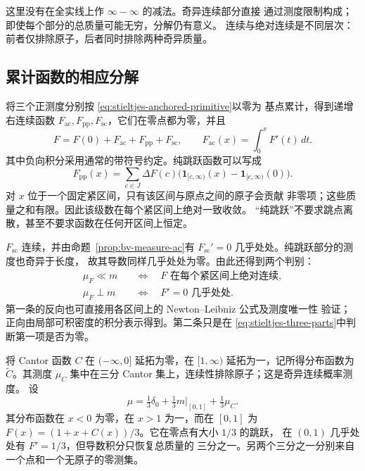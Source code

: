 这里没有在全实线上作 \(\infty-\infty\) 的减法。奇异连续部分直接
通过测度限制构成；即使每个部分的总质量可能无穷，分解仍有意义。
连续与绝对连续是不同层次：前者仅排除原子，后者同时排除两种奇异质量。

\subsection{累计函数的相应分解}

将三个正测度分别按 \eqref{eq:stieltjes-anchored-primitive}以零为
基点累计，得到递增右连续函数 \(F_{\mathrm{ac}},F_{\mathrm{pp}},
F_{\mathrm{sc}}\)，它们在零点都为零，并且
\[
 F=F(0)+F_{\mathrm{ac}}+F_{\mathrm{pp}}+F_{\mathrm{sc}},
 \qquad F_{\mathrm{ac}}(x)=\int_0^xF'(t)\,dt.
\]
其中负向积分采用通常的带符号约定。纯跳跃函数可以写成
\begin{equation}\label{eq:stieltjes-jump-function}
 F_{\mathrm{pp}}(x)=\sum_{c\in J}\Delta F(c)
 \bigl(\mathbf1_{[c,\infty)}(x)-\mathbf1_{[c,\infty)}(0)\bigr).
\end{equation}
对 \(x\) 位于一个固定紧区间，只有该区间与原点之间的原子会贡献
非零项；这些质量之和有限。因此该级数在每个紧区间上绝对一致收敛。
“纯跳跃”不要求跳点离散，甚至不要求函数在任何开区间上恒定。

\(F_{\mathrm{sc}}\) 连续，并由命题~\ref{prop:bv-measure-ac}有
\(F_{\mathrm{sc}}'=0\) 几乎处处。纯跳跃部分的测度也奇异于长度，
故其导数同样几乎处处为零。由此还得到两个判别：
\[
 \begin{aligned}
 \mu_F\ll m
 &\quad\Longleftrightarrow\quad
 F\text{ 在每个紧区间上绝对连续},\\
 \mu_F\perp m
 &\quad\Longleftrightarrow\quad F'=0\text{ 几乎处处}.
 \end{aligned}
\]
第一条的反向也可直接用各区间上的 Newton--Leibniz 公式及测度唯一性
验证；正向由局部可积密度的积分表示得到。第二条只是在
\eqref{eq:stieltjes-three-parts}中判断第一项是否为零。

\begin{example}[同时具有三部分的分布]
将 Cantor 函数 \(C\) 在 \(({-\infty},0]\) 延拓为零，在 \([1,\infty)\)
延拓为一，记所得分布函数为 \(\widetilde C\)。其测度 \(\mu_C\)
集中在三分 Cantor 集上，连续性排除原子；这是奇异连续概率测度。
设
\[
 \mu=\tfrac13\delta_0+\tfrac13m|_{[0,1]}+\tfrac13\mu_C.
\]
其分布函数在 \(x<0\) 为零，在 \(x>1\) 为一，而在 \([0,1]\) 为
\(F(x)=(1+x+C(x))/3\)。它在零点有大小 \(1/3\) 的跳跃，
在 \((0,1)\) 几乎处处有 \(F'=1/3\)，但导数积分只恢复总质量的
三分之一。另两个三分之一分别来自一个点和一个无原子的零测集。
\end{example}

